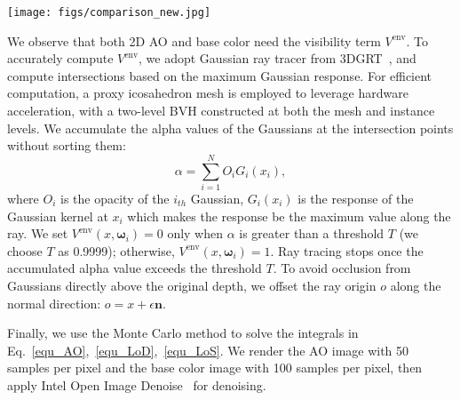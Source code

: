 \begin{figure*} [ht]
  \centering
  \texttt{[image: figs/comparison\_new.jpg]}
  \label{fig_comparison1}
\end{figure*}

We observe that both 2D AO and base color need the visibility term $V^{\text{env}}$. To accurately compute $V^{\text{env}}$, we 
adopt Gaussian ray tracer from 3DGRT~\cite{3dgrt2024}, and compute intersections based on the maximum Gaussian response.  For efficient computation, a proxy icosahedron mesh is employed to leverage hardware acceleration, with a two-level BVH constructed at both the mesh and instance levels. We accumulate the alpha values of the Gaussians at the intersection points without sorting them:
\begin{equation}
    \alpha = \sum_{i=1}^{N} O_i G_i(x_i), 
\end{equation}
where $O_i$ is the opacity of the $i_{th}$ Gaussian, $G_i(x_i)$ is the response of the Gaussian kernel at $x_i$ which makes the response be the maximum value along the ray. We set $V^{\text{env}}\left(x,\boldsymbol{\omega}_{i}\right) = 0$ only when $\alpha$ is greater than a threshold $T$ (we choose $T$ as 0.9999); otherwise, $V^{\text{env}}\left(x,\boldsymbol{\omega}_{i}\right) = 1$. Ray tracing stops once the accumulated alpha value exceeds the threshold $T$. To avoid occlusion from Gaussians directly above the original depth, we offset the ray origin $o$ along the normal direction: $o=x+\epsilon \mathbf{n}$.


Finally, we use the Monte Carlo method to solve the integrals in Eq.~\ref{equ_AO},~\ref{equ_LoD},~\ref{equ_LoS}. We render the AO image with 50 samples per pixel and the base color image with 100 samples per pixel, then apply Intel Open Image Denoise~\cite{IntelOIDN2025} for denoising. 









 





